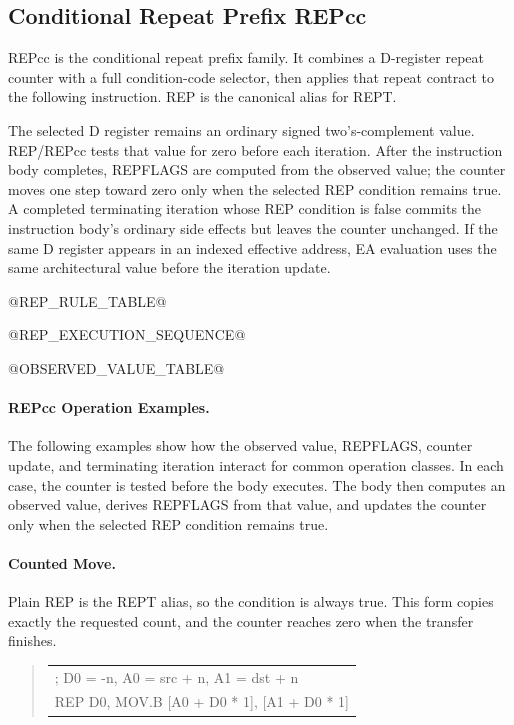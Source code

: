 \subsection{Conditional Repeat Prefix REPcc}
REPcc is the conditional repeat prefix family. It combines a D-register repeat counter with a full
condition-code selector, then applies that repeat contract to the following instruction. REP is the
canonical alias for REPT.

The selected D register remains an ordinary signed two's-complement value. REP/REPcc tests that value for zero
before each iteration. After the instruction body completes, REPFLAGS are computed from the observed value; the
counter moves one step toward zero only when the selected REP condition remains true. A completed terminating
iteration whose REP condition is false commits the instruction body's ordinary side effects but leaves the
counter unchanged. If the same D register appears in an indexed effective address, EA evaluation uses the same
architectural value before the iteration update.

@REP_RULE_TABLE@

@REP_EXECUTION_SEQUENCE@

@OBSERVED_VALUE_TABLE@

\paragraph{REPcc Operation Examples.}
The following examples show how the observed value, REPFLAGS, counter update,
and terminating iteration interact for common operation classes. In each case,
the counter is tested before the body executes. The body then computes an
observed value, derives REPFLAGS from that value, and updates the counter only
when the selected REP condition remains true.

\paragraph{Counted Move.}
Plain REP is the REPT alias, so the condition is always true. This form copies
exactly the requested count, and the counter reaches zero when the transfer
finishes.

\begin{quote}
\begingroup\small\ttfamily
\begin{tabular}{@{}l@{}}
; D0 = -n, A0 = src + n, A1 = dst + n\\
REP D0, MOV.B [A0 + D0 * 1], [A1 + D0 * 1]\\
\end{tabular}
\endgroup
\end{quote}

